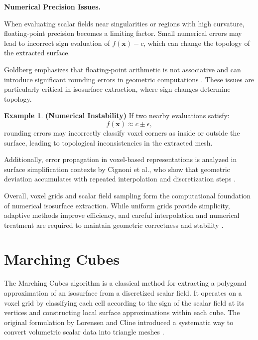 \documentclass[12pt, a4paper, oneside]{book}
\theoremstyle{plain}
\theoremstyle{definition}
\newtheorem{example}[theorem]{Example}
\theoremstyle{remark}
\theoremstyle{definition}
\begin{document}
\vspace{0.5em}

\textbf{Numerical Precision Issues.}

When evaluating scalar fields near singularities or regions with high curvature, floating-point precision becomes a limiting factor. Small numerical errors may lead to incorrect sign evaluation of $f(\mathbf{x}) - c$, which can change the topology of the extracted surface.

Goldberg emphasizes that floating-point arithmetic is not associative and can introduce significant rounding errors in geometric computations \cite{goldberg1991every}. These issues are particularly critical in isosurface extraction, where sign changes determine topology.

\begin{example}
    \textbf{(Numerical Instability)}
If two nearby evaluations satisfy:
\[
f(\mathbf{x}) \approx c \pm \epsilon,
\]
rounding errors may incorrectly classify voxel corners as inside or outside the surface, leading to topological inconsistencies in the extracted mesh.
\end{example}


Additionally, error propagation in voxel-based representations is analyzed in surface simplification contexts by Cignoni et al., who show that geometric deviation accumulates with repeated interpolation and discretization steps \cite{cignoni1998metro}.

\vspace{0.5em}

Overall, voxel grids and scalar field sampling form the computational foundation of numerical isosurface extraction. While uniform grids provide simplicity, adaptive methods improve efficiency, and careful interpolation and numerical treatment are required to maintain geometric correctness and stability \cite{lorensen1998marching,bloomenthal1997introduction,frisken2000adaptively,cignoni1998metro,goldberg1991every}.
\section{Marching Cubes}

The Marching Cubes algorithm is a classical method for extracting a polygonal approximation of an isosurface from a discretized scalar field. It operates on a voxel grid by classifying each cell according to the sign of the scalar field at its vertices and constructing local surface approximations within each cube. The original formulation by Lorensen and Cline introduced a systematic way to convert volumetric scalar data into triangle meshes \cite{lorensen1998marching}.
\end{document}
